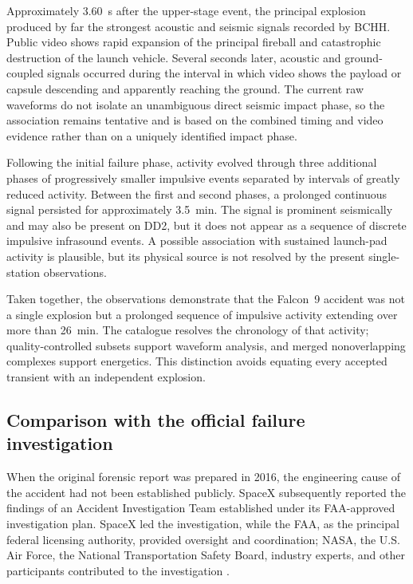 \documentclass[]{seismica}
\begin{document}
Approximately 3.60~s after the upper-stage event, the principal explosion
produced by far the strongest acoustic and seismic signals recorded by BCHH.
Public video shows rapid expansion of the principal fireball and catastrophic
destruction of the launch vehicle. Several seconds later, acoustic and ground-coupled signals occurred during
the interval in which video shows the payload or capsule descending and
apparently reaching the ground. The current raw waveforms do not isolate an
unambiguous direct seismic impact phase, so the association remains tentative
and is based on the combined timing and video evidence rather than on a uniquely
identified impact phase.

Following the initial failure phase, activity evolved through three
additional phases of progressively smaller impulsive events separated by
intervals of greatly reduced activity. Between the first and second phases, a
prolonged continuous signal persisted for approximately 3.5~min. The signal is
prominent seismically and may also be present on DD2, but it does not appear as
a sequence of discrete impulsive infrasound events. A possible association with
sustained launch-pad activity is plausible, but its physical source is not
resolved by the present single-station observations.

Taken together, the observations demonstrate that the Falcon~9 accident was
not a single explosion but a prolonged sequence of impulsive activity extending
over more than 26~min. The catalogue resolves the chronology of that activity;
quality-controlled subsets support waveform analysis, and merged nonoverlapping
complexes support energetics. This distinction avoids equating every accepted
transient with an independent explosion.

\subsection{Comparison with the official failure investigation}
\label{sec:discussion_investigation}

When the original forensic report was prepared in 2016, the engineering cause
of the accident had not been established publicly. SpaceX subsequently
reported the findings of an Accident Investigation Team established under its
FAA-approved investigation plan. SpaceX led the investigation, while the FAA,
as the principal federal licensing authority, provided oversight and
coordination; NASA, the U.S. Air Force, the National Transportation Safety
Board, industry experts, and other participants contributed to the
investigation \citep{spacex_anomaly_2017,nasa_sma_falcon9}.
\end{document}
